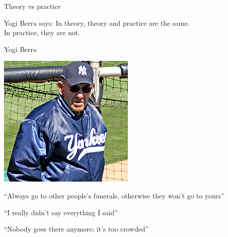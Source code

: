 \begin{frame}{Theory vs practice}
\begin{block}{Yogi Berra says:}
In theory, theory and practice are the same. \\
In practice, they are not.
\end{block}

\pause
\begin{block}{Yogi Berra}
\begin{minipage}{0.20\textwidth}
\includegraphics[width=\textwidth]{yogi.jpg}
\end{minipage}
\begin{minipage}{0.75\textwidth}
\BI
\item “Always go to other people's funerals, otherwise they won't go to yours”
\item “I really didn't say everything I said”
\item “Nobody goes there anymore; it's too crowded”
\EI
\end{minipage}
\end{block}	

\end{frame}

